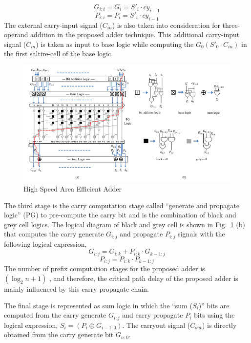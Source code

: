 \begin{equation}
G_{i:i} = G_{i} = S'_{i} \cdot cy_{i−1}
	\label{eq3}
\end{equation}
\begin{equation}
P_{i:i} = P_{i} = S'_{i} \cdot cy_{i−1}
	\label{eq4}
\end{equation}
The external carry-input signal ($ C_{in} $) is also taken into consideration for three-operand addition in the proposed adder technique. This additional carry-input signal ($ C_{in} $) is taken as input to base logic while computing the $ G_{0}(S'_{0} \cdot C_{in}) $ in the first saltire-cell of the base logic.
\begin{figure}[htb]
	\centering
	\includegraphics[width=0.80\columnwidth]{Figures/x5}	
	\caption{High Speed Area Efficient Adder}
	\label{fig:x5}
\end{figure}
The third stage is the carry computation stage called “generate and propagate logic” (PG) to pre-compute the carry bit and is the combination of black and grey cell logics. The logical diagram of black and grey cell is shown in Fig.~\ref{fig:x5} (b) that computes the carry generate $ G_{i:j} $ and propagate $ P_{i:j} $ signals with the following logical expression,
\begin{equation}
G_{i:j} = G_{i:k} + P_{i:k} \cdot G_{k−1:j}
	\label{eq5}
\end{equation}
\begin{equation}
P_{i:j} = P_{i:k} \cdot P_{k−1:j}
	\label{eq6}
\end{equation}
The number of prefix computation stages for the proposed adder is $(\log_{2}n + 1)$ , and therefore, the critical path delay of the proposed adder is mainly influenced by this carry propagate chain. \par
The final stage is represented as sum logic in which the “sum ($ S_{i} $)” bits are computed from the carry generate $ G_{i:j} $ and carry propagate $ P_{i} $ bits using the logical expression, $ S_{i} = (P_{i} \oplus G_{i−1:0}) $. The carryout signal ($ C_{out} $) is directly obtained from the carry generate bit $ G_{n:0} $.








